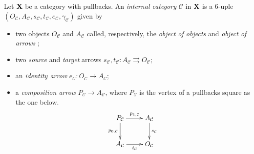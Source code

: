 \documentclass[a4paper,UKenglish,cleveref,pdftex,thm-restate,numberwithinsect]{lipics-v2021}
\def\X{\textbf {\textup{X}}}
\begin{document}
\begin{definition}\label{def:internal}
	Let $\X$ be a category with pullbacks. An \emph{internal category} $\mathcal{C}$ in $\X$ is a $6$-uple $(O_{\mathcal{C}}, A_{\mathcal{C}}, s_{\mathcal{C}}, t_{\mathcal{C}},e_{\mathcal{C}},  \gamma_{\mathcal{C}})$ given by
	\begin{itemize}
		\item two objects $O_{\mathcal{C}}$ and $A_{\mathcal{C}}$ called, respectively, the \emph{object of objects} and \emph{object of arrows} ;
		\item two \emph{source} and \emph{target} arrows $s_{\mathcal{C}}, t_{\mathcal{C}}\colon A_{\mathcal{C}}\rightrightarrows O_{\mathcal{C}}$;
		\item an \emph{identity arrow} $e_{\mathcal{C}}\colon O_{\mathcal{C}}\to A_{\mathcal{C}}$;
		\item a \emph{composition arrow} $P_{\mathcal{C}}\to A_{\mathcal{C}}$, where $P_{\mathcal{C}}$ is the vertex of a pullbacks square as the one below.
		\[\xymatrix{P_{\mathcal{C}} \ar[r]^{p_{1, \mathcal{C}}} \ar[d]_{p_{0, \mathcal{C}}} &A_{\mathcal{C}} \ar[d]^{s_{\mathcal{C}}} \\ A_{\mathcal{C}} \ar[r]_{t_{\mathcal{C}}}  &O_{\mathcal{C}} }\]
	\end{itemize}


\end{definition}
\end{document}
